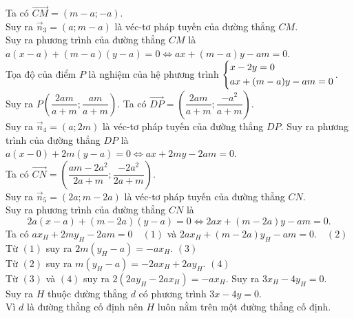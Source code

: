 \begin{bt}
{		Ta có $\overrightarrow{CM}=(m-a;-a)$. \\
		Suy ra ${\overrightarrow{n}}_3=(a;m-a)$ là véc-tơ pháp tuyến của đường thẳng $CM$.\\
		Suy ra phương trình của đường thẳng $CM$ là
		$a(x-a)+(m-a)(y-a)=0\Leftrightarrow ax+(m-a)y-am=0$.\\
		Tọa độ của điểm $P$ là nghiệm của hệ phương trình $\left\{\begin{aligned}& x-2y=0 \\ & ax+(m-a)y-am=0 \end{aligned}\right.$.\\
		Suy ra $P\left(\dfrac{2am}{a+m};\dfrac{am}{a+m}\right)$. Ta có $\overrightarrow{DP}=\left(\dfrac{2am}{a+m};\dfrac{-{a}^2}{a+m}\right)$. \\
		Suy ra ${\overrightarrow{n}}_4=(a;2m)$ là véc-tơ pháp tuyến của đường thẳng $DP$. Suy ra phương trình của đường thẳng $DP$ là $a(x-0)+2m(y-a)=0\Leftrightarrow ax+2my-2am=0$.\\
		Ta có $\overrightarrow{CN}=\left(\dfrac{am-2{a}^2}{2a+m};\dfrac{-2a^2}{2a+m}\right)$. \\
		Suy ra $\overrightarrow{n}_5=(2a;m-2a)$ là véc-tơ pháp tuyến của đường thẳng $CN$. \\
		Suy ra phương trình của đường thẳng $CN$ là
		$$2a(x-a)+(m-2a)(y-a)=0\Leftrightarrow 2ax+(m-2a)y-am=0.$$
		Ta có $ax_H+2my_H-2am=0\quad(1)$ và $2ax_H+(m-2a)y_H-am=0.\quad(2)$\\
		Từ $(1)$ suy ra  $2m(y_H-a)=-ax_H.$ \hfill$(3)$\\
		Từ $(2)$ suy ra  $m(y_H-a)=-2ax_H+2ay_H$. \hfill$(4)$\\
		Từ $(3)$ và $(4)$ suy ra $2(2ay_H-2ax_H)=-ax_H$. Suy ra $3x_H-4y_H=0$.\\
		Suy ra $H$ thuộc đường thẳng $d$ có phương trình $3x-4y=0$. \\
		Vì $d$ là đường thẳng cố định nên $H$ luôn nằm trên một đường thẳng cố định.
	}
\end{bt}
